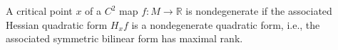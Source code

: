 A critical point $x$ of a $C^2$ map $f: M \to \mathbb{R}$ is nondegenerate if the associated Hessian quadratic form $H_x f$ is a nondegenerate quadratic form, i.e., the associated symmetric bilinear form has maximal rank.
